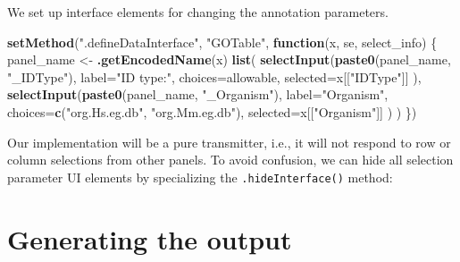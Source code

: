 \documentclass[
]{book}
\newenvironment{Shaded}{\begin{snugshade}}{\end{snugshade}}
\newcommand{\ControlFlowTok}[1]{\textcolor[rgb]{0.13,0.29,0.53}{\textbf{#1}}}
\newcommand{\DataTypeTok}[1]{\textcolor[rgb]{0.13,0.29,0.53}{#1}}
\newcommand{\KeywordTok}[1]{\textcolor[rgb]{0.13,0.29,0.53}{\textbf{#1}}}
\newcommand{\NormalTok}[1]{#1}
\newcommand{\OperatorTok}[1]{\textcolor[rgb]{0.81,0.36,0.00}{\textbf{#1}}}
\newcommand{\OtherTok}[1]{\textcolor[rgb]{0.56,0.35,0.01}{#1}}
\newcommand{\StringTok}[1]{\textcolor[rgb]{0.31,0.60,0.02}{#1}}
\begin{document}
We set up interface elements for changing the annotation parameters.

\begin{Shaded}
\begin{Highlighting}[]
\KeywordTok{setMethod}\NormalTok{(}\StringTok{".defineDataInterface"}\NormalTok{, }\StringTok{"GOTable"}\NormalTok{, }\ControlFlowTok{function}\NormalTok{(x, se, select_info) \{}
\NormalTok{    panel_name <-}\StringTok{ }\KeywordTok{.getEncodedName}\NormalTok{(x)}
    \KeywordTok{list}\NormalTok{(}
        \KeywordTok{selectInput}\NormalTok{(}\KeywordTok{paste0}\NormalTok{(panel_name, }\StringTok{"_IDType"}\NormalTok{),}
            \DataTypeTok{label=}\StringTok{"ID type:"}\NormalTok{,}
            \DataTypeTok{choices=}\NormalTok{allowable,}
            \DataTypeTok{selected=}\NormalTok{x[[}\StringTok{"IDType"}\NormalTok{]]}
\NormalTok{        ),}
        \KeywordTok{selectInput}\NormalTok{(}\KeywordTok{paste0}\NormalTok{(panel_name, }\StringTok{"_Organism"}\NormalTok{),}
            \DataTypeTok{label=}\StringTok{"Organism"}\NormalTok{,}
            \DataTypeTok{choices=}\KeywordTok{c}\NormalTok{(}\StringTok{"org.Hs.eg.db"}\NormalTok{, }\StringTok{"org.Mm.eg.db"}\NormalTok{),}
            \DataTypeTok{selected=}\NormalTok{x[[}\StringTok{"Organism"}\NormalTok{]]}
\NormalTok{        )}
\NormalTok{    )}
\NormalTok{\})}
\end{Highlighting}
\end{Shaded}

Our implementation will be a pure transmitter, i.e., it will not respond to row or column selections from other panels.
To avoid confusion, we can hide all selection parameter UI elements by specializing the \texttt{.hideInterface()} method:

\begin{Shaded}
\end{Shaded}

\hypertarget{generating-the-output}{%
\section{Generating the output}\label{generating-the-output}}
\end{document}
